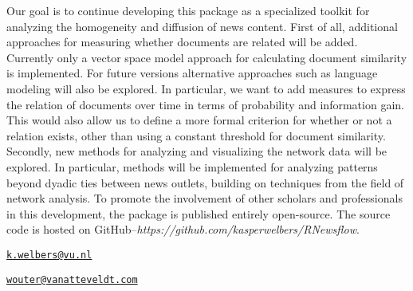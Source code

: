 Our goal is to continue developing this package as a specialized toolkit
for analyzing the homogeneity and diffusion of news content. First of
all, additional approaches for measuring whether documents are related
will be added. Currently only a vector space model approach for
calculating document similarity is implemented. For future versions
alternative approaches such as language modeling will also be explored.
In particular, we want to add measures to express the relation of
documents over time in terms of probability and information gain. This
would also allow us to define a more formal criterion for whether or not
a relation exists, other than using a constant threshold for document
similarity. Secondly, new methods for analyzing and visualizing the
network data will be explored. In particular, methods will be
implemented for analyzing patterns beyond dyadic ties between news
outlets, building on techniques from the field of network analysis. To
promote the involvement of other scholars and professionals in this
development, the package is published entirely open-source. The source
code is hosted on
GitHub--\emph{https://github.com/kasperwelbers/RNewsflow}.



\address{
Kasper Welbers\\
VU University Amsterdam\\
De Boelelaan 1081,\\ 1081 HV Amsterdam, The Netherlands\\
}
\href{mailto:k.welbers@vu.nl}{\nolinkurl{k.welbers@vu.nl}}

\address{
Wouter van Atteveldt\\
VU University Amsterdam\\
De Boelelaan 1081,\\ 1081 HV Amsterdam, The Netherlands\\
}
\href{mailto:wouter@vanatteveldt.com}{\nolinkurl{wouter@vanatteveldt.com}}

